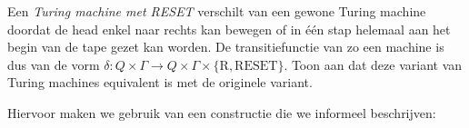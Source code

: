 \documentclass[a4paper]{article}
\begin{document}
\begin{question}
Een \emph{Turing machine met RESET} verschilt van een gewone Turing machine doordat de head enkel naar rechts kan bewegen of in \'e\'en stap helemaal aan het begin van de tape gezet kan worden. De transitiefunctie van zo een machine is dus van de vorm $\delta : Q \times \Gamma \to Q \times \Gamma \times \{ \text{R}, \text{RESET} \}$. Toon aan dat deze variant van Turing machines equivalent is met de originele variant.
\begin{answer}
Hiervoor maken we gebruik van een constructie die we informeel beschrijven:
\begin{construction}

\end{construction}
\end{answer}
\end{question}
\end{document}
